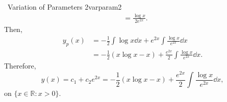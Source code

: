 \begin{example}{\Difficulty\,\Difficulty\,\,Variation of Parameters 2}{varparam2}
\begin{align*}
                &=\frac{\log x}{2e^{2x}}.
            \end{align*}
            Then,
            \begin{align*}
                y_p(x)&=-\frac{1}{2}\int \log x \dd x+e^{2x}\int \frac{\log x}{e^{2x}}\dd x \\
                &=-\frac{1}{2}\left(x\log x-x\right)+\frac{e^{2x}}{2}\int \frac{\log x}{e^{2x}}\dd x.
            \end{align*}
            Therefore,
            \begin{equation*}
                y(x)=c_1+c_2e^{2x}=-\frac{1}{2}\left(x\log x-x\right)+\frac{e^{2x}}{2}\int \frac{\log x}{e^{2x}}\dd x,
            \end{equation*}
            on \(\{x\in\mathbb{R}:x>0\}\).

        \end{example}
        \pagebreak
